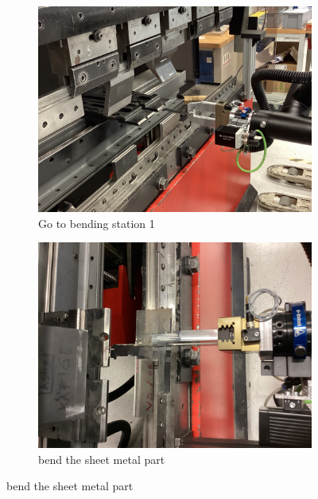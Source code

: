 
\begin{figure}[h]
    \centering
    \begin{subfigure}[b]{0.32\textwidth}
        \centering
        \includegraphics[width=\textwidth]{figures/bending/bending1-002.png}
        \caption{Go to bending station 1}
        \label{subfig:bending1-before}
    \end{subfigure}\hspace{0.1cm}
    \begin{subfigure}[b]{0.32\textwidth}
        \centering
        \includegraphics[width=\textwidth]{figures/bending/bending1-003.png}
        \caption{bend the sheet metal part}
        \label{subfig:bending1}

\end{subfigure}
\end{figure}
